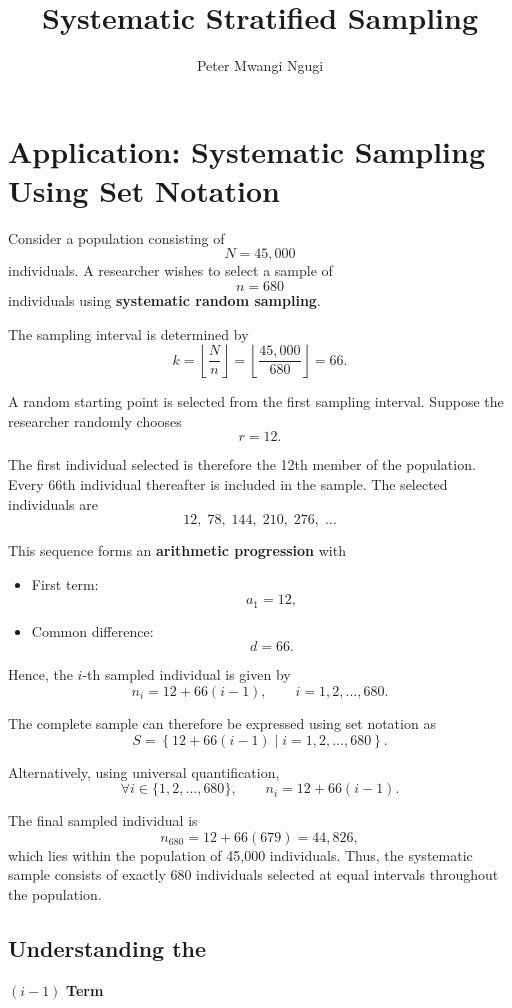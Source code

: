 \documentclass{article}
\title{Systematic Stratified Sampling}
\author{Peter Mwangi Ngugi}
\begin{document}
	\maketitle
	
	\section*{Application: Systematic Sampling Using Set Notation}
	
	Consider a population consisting of
	\[
	N = 45,000
	\]
	individuals. A researcher wishes to select a sample of
	\[
	n = 680
	\]
	individuals using \textbf{systematic random sampling}.
	
	The sampling interval is determined by
	\[
	k=\left\lfloor\frac{N}{n}\right\rfloor
	=\left\lfloor\frac{45,000}{680}\right\rfloor
	=66.
	\]
	
	A random starting point is selected from the first sampling interval. Suppose the researcher randomly chooses
	\[
	r=12.
	\]
	
	The first individual selected is therefore the 12th member of the population. Every 66th individual thereafter is included in the sample. The selected individuals are
	\[
	12,\;78,\;144,\;210,\;276,\;\ldots
	\]
	
	This sequence forms an \textbf{arithmetic progression} with
	\begin{itemize}
		\item First term:
		\[
		a_1=12,
		\]
		\item Common difference:
		\[
		d=66.
		\]
	\end{itemize}
	
	Hence, the \(i\)-th sampled individual is given by
	\[
	n_i=12+66(i-1),\qquad i=1,2,\ldots,680.
	\]
	
	The complete sample can therefore be expressed using set notation as
	\[
	S=\left\{12+66(i-1)\mid i=1,2,\ldots,680\right\}.
	\]
	
	Alternatively, using universal quantification,
	\[
	\forall i\in\{1,2,\ldots,680\},\qquad
	n_i=12+66(i-1).
	\]
	
	The final sampled individual is
	\[
	n_{680}
	=12+66(679)
	=44,826,
	\]
	which lies within the population of 45,000 individuals. Thus, the systematic sample consists of exactly 680 individuals selected at equal intervals throughout the population.
	
	\subsection*{Understanding the }\((i-1)\)\textbf{ Term}
	
\end{document}

